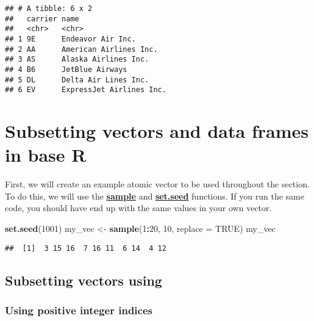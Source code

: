 \documentclass[]{book}
\newenvironment{Shaded}{\begin{snugshade}}{\end{snugshade}}
\newcommand{\DataTypeTok}[1]{\textcolor[rgb]{0.13,0.29,0.53}{#1}}
\newcommand{\DecValTok}[1]{\textcolor[rgb]{0.00,0.00,0.81}{#1}}
\newcommand{\KeywordTok}[1]{\textcolor[rgb]{0.13,0.29,0.53}{\textbf{#1}}}
\newcommand{\NormalTok}[1]{#1}
\newcommand{\OperatorTok}[1]{\textcolor[rgb]{0.81,0.36,0.00}{\textbf{#1}}}
\newcommand{\OtherTok}[1]{\textcolor[rgb]{0.56,0.35,0.01}{#1}}
\newcommand{\StringTok}[1]{\textcolor[rgb]{0.31,0.60,0.02}{#1}}
\begin{document}
\begin{verbatim}
## # A tibble: 6 x 2
##   carrier name                    
##   <chr>   <chr>                   
## 1 9E      Endeavor Air Inc.       
## 2 AA      American Airlines Inc.  
## 3 AS      Alaska Airlines Inc.    
## 4 B6      JetBlue Airways         
## 5 DL      Delta Air Lines Inc.    
## 6 EV      ExpressJet Airlines Inc.
\end{verbatim}

\hypertarget{subset1}{%
\chapter{Subsetting vectors and data frames in base R}\label{subset1}}

First, we will create an example atomic vector to be used throughout the section. To do this, we will use the \protect\hyperlink{sample}{\textbf{sample}} and \protect\hyperlink{setseed}{\textbf{set.seed}} functions. If you run the same code, you should have end up with the same values in your own vector.

\begin{Shaded}
\begin{Highlighting}[]
\KeywordTok{set.seed}\NormalTok{(}\DecValTok{1001}\NormalTok{)}
\NormalTok{my_vec <-}\StringTok{ }\KeywordTok{sample}\NormalTok{(}\DecValTok{1}\OperatorTok{:}\DecValTok{20}\NormalTok{, }\DecValTok{10}\NormalTok{, }\DataTypeTok{replace =} \OtherTok{TRUE}\NormalTok{)}
\NormalTok{my_vec}
\end{Highlighting}
\end{Shaded}

\begin{verbatim}
##  [1]  3 15 16  7 16 11  6 14  4 12
\end{verbatim}

\hypertarget{sqbrackets}{%
\section*{\texorpdfstring{Subsetting vectors using \textbf{\protect\hyperlink{dollarsignnew}{}}}{Subsetting vectors using }}\label{sqbrackets}}

\hypertarget{posindices}{%
\subsection*{Using positive integer indices}\label{posindices}}
\end{document}
